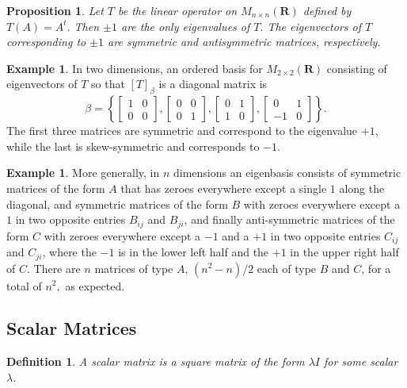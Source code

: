 \documentclass[12pt]{article}
\theoremstyle{plain}
\newtheorem{proposition}[theorem]{Proposition}
\newtheorem{definition}[theorem]{Definition}
\theoremstyle{definition}
\newtheorem{example}[theorem]{Example}
\theoremstyle{remark}
\newcommand{\R}{\mathbf R}
\begin{document}
\begin{proposition}
Let $T$ be the linear operator on $M_{n\times n}(\R)$ defined by $T(A) = A^t.$ Then $\pm 1$ are the only eigenvalues of $T.$ The eigenvectors of $T$ corresponding to $\pm 1$ are symmetric and antisymmetric matrices, respectively.
\end{proposition}

\begin{example}
In two dimensions, an ordered basis for $M_{2 \times 2}(\R)$ consisting of eigenvectors of $T$ so that $[T]_\beta$ is a diagonal matrix is 
$$\beta = \left\{ 
\begin{bmatrix}
1 & 0 \\
0 & 0
\end{bmatrix},
\begin{bmatrix}
0 & 0 \\
0 & 1
\end{bmatrix},
\begin{bmatrix}
0 & 1 \\
1 & 0
\end{bmatrix},
\begin{bmatrix}
0 & 1 \\
-1 & 0
\end{bmatrix}
\right\}.$$
The first three matrices are symmetric and correspond to the eigenvalue $+1$, while the last is skew-symmetric and corresponds to $-1.$
\end{example}

\begin{example}
More generally, in $n$ dimensions an eigenbasis consists of symmetric matrices of the form $A$ that has zeroes everywhere except a single $1$ along the diagonal, and symmetric matrices of the form $B$ with zeroes everywhere except a $1$ in two opposite entries $B_{ij}$ and $B_{ji}$, and finally anti-symmetric matrices of the form $C$ with zeroes everywhere except a $-1$ and a $+1$ in two opposite entries $C_{ij}$ and $C_{ji}$, where the $-1$ is in the lower left half and the $+1$ in the upper right half of $C$. There are $n$ matrices of type $A$, $(n^2 - n) / 2$ each of type $B$ and $C$, for a total of $n^2,$ as expected.
\end{example}

\subsection{Scalar Matrices}

\begin{definition}
A scalar matrix is a square matrix of the form $\lambda I$ for some scalar $\lambda$.
\end{definition}
\end{document}
